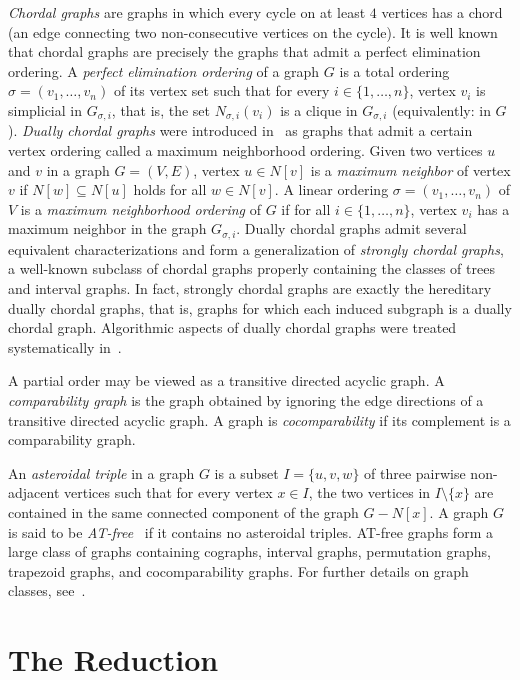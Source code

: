 \documentclass[]{elsarticle}
\begin{document}
\emph{Chordal graphs} are graphs in which every cycle on at least $4$ vertices has a chord (an edge connecting two non-consecutive vertices on the cycle). 
It is well known that chordal graphs are precisely the graphs that admit a perfect elimination ordering. 
A  \emph{perfect elimination ordering} of a graph $G$ is a total ordering $\sigma = (v_1,\ldots, v_n)$ of its vertex set such that for every $i\in \{1,\ldots, n\}$, vertex $v_i$ is simplicial in $G_{\sigma,i}$, that is, the set $N_{\sigma,i}(v_i)$ is a clique in $G_{\sigma,i}$ (equivalently: in $G$).
\emph{Dually chordal graphs} were introduced in~\cite{BDCV} as graphs that admit a certain vertex ordering called a maximum neighborhood ordering.
Given two vertices $u$ and $v$ in a graph $G = (V,E)$, vertex $u\in N[v]$ is a \emph{maximum neighbor} of vertex $v$ if $N[w] \subseteq N[u]$ holds for all $w\in N[v]$. 
A linear ordering $\sigma=(v_1,\ldots, v_n)$ of $V$ is a \emph{maximum neighborhood ordering} of $G$ if for all $i\in \{1,\ldots, n\}$, vertex $v_i$ has a maximum neighbor in the graph $G_{\sigma,i}$.
Dually chordal graphs admit several equivalent characterizations and form a generalization of \emph{strongly chordal graphs}, a well-known subclass of chordal graphs properly containing the classes of trees and interval graphs.
In fact, strongly chordal graphs are exactly the hereditary dually chordal graphs, that is, graphs for which each induced subgraph is a dually chordal graph. Algorithmic aspects of dually chordal graphs were treated systematically in~\cite{BCD98}.

A partial order may be viewed as a transitive directed acyclic graph. 
A \emph{comparability graph} is the graph obtained by ignoring the edge directions of a transitive directed acyclic graph. 
A graph is \emph{cocomparability} if its complement is a comparability graph.

An \emph{asteroidal triple} in a graph $G$ is a subset $I = \{u,v,w\}$ of three pairwise non-adjacent vertices such that for every vertex $x\in I$, the two vertices in $I\setminus \{x\}$ are contained in the same connected component of the graph $G-N[x]$. 
A graph $G$ is said to be \emph{AT-free}~\cite{COS97} if it contains no asteroidal triples.
AT-free graphs form a large class of graphs containing cographs, interval graphs, permutation graphs, trapezoid graphs, and cocomparability graphs. For further details on graph classes, see~\cite{BLV99,Gol04}.


\section{The Reduction}
\label{sec:wed-mwis}
\end{document}

